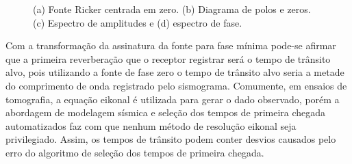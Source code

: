 \begin{figure}[H]
	\centering
	
		
	\caption{(a) Fonte Ricker centrada em zero. (b) Diagrama de polos e zeros. (c) Espectro de amplitudes e (d) espectro de fase.}
	\label{fig:ricker_zero_phase}
\end{figure}

\noindent Com a transformação da assinatura da fonte para fase mínima pode-se afirmar que a primeira reverberação que o receptor registrar será o tempo de trânsito alvo, pois utilizando a fonte de fase zero o tempo de trânsito alvo seria a metade do comprimento de onda registrado pelo sismograma. Comumente, em ensaios de tomografia, a equação eikonal é utilizada para gerar o dado observado, porém a abordagem de modelagem sísmica e seleção dos tempos de primeira chegada automatizados faz com que nenhum método de resolução eikonal seja privilegiado. Assim, os tempos de trânsito podem conter desvios causados pelo erro do algoritmo de seleção dos tempos de primeira chegada. 

